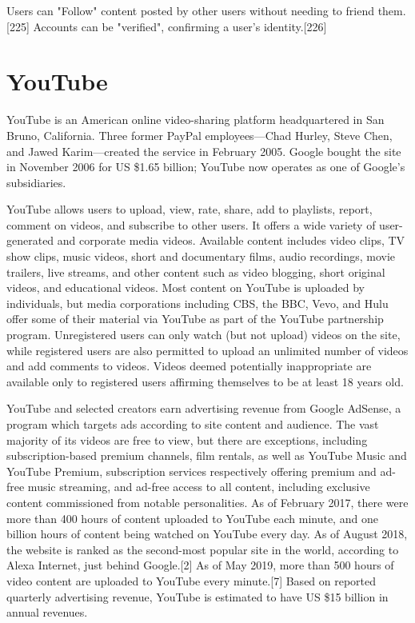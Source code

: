 \documentclass[12pt]{article}
\begin{document}
Users can "Follow" content posted by other users without needing to friend them.[225] Accounts can be "verified", confirming a user's identity.[226]






\section{YouTube}



YouTube is an American online video-sharing platform headquartered in San Bruno, California. Three former PayPal employees—Chad Hurley, Steve Chen, and Jawed Karim—created the service in February 2005. Google bought the site in November 2006 for US \$1.65 billion; YouTube now operates as one of Google's subsidiaries.

YouTube allows users to upload, view, rate, share, add to playlists, report, comment on videos, and subscribe to other users. It offers a wide variety of user-generated and corporate media videos. Available content includes video clips, TV show clips, music videos, short and documentary films, audio recordings, movie trailers, live streams, and other content such as video blogging, short original videos, and educational videos. Most content on YouTube is uploaded by individuals, but media corporations including CBS, the BBC, Vevo, and Hulu offer some of their material via YouTube as part of the YouTube partnership program. Unregistered users can only watch (but not upload) videos on the site, while registered users are also permitted to upload an unlimited number of videos and add comments to videos. Videos deemed potentially inappropriate are available only to registered users affirming themselves to be at least 18 years old.

YouTube and selected creators earn advertising revenue from Google AdSense, a program which targets ads according to site content and audience. The vast majority of its videos are free to view, but there are exceptions, including subscription-based premium channels, film rentals, as well as YouTube Music and YouTube Premium, subscription services respectively offering premium and ad-free music streaming, and ad-free access to all content, including exclusive content commissioned from notable personalities. As of February 2017, there were more than 400 hours of content uploaded to YouTube each minute, and one billion hours of content being watched on YouTube every day. As of August 2018, the website is ranked as the second-most popular site in the world, according to Alexa Internet, just behind Google.[2] As of May 2019, more than 500 hours of video content are uploaded to YouTube every minute.[7] Based on reported quarterly advertising revenue, YouTube is estimated to have US \$15 billion in annual revenues.
\end{document}
